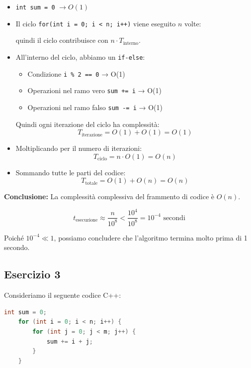 \begin{itemize}
	
	\item \texttt{int sum = 0} $\rightarrow O(1)$
	
	\item Il ciclo \texttt{for(int i = 0; i < n; i++)} viene eseguito $n$ volte:
	
	quindi il ciclo contribuisce con $n \cdot T_{\text{interno}}$.
	
	\item All'interno del ciclo, abbiamo un \texttt{if-else}:
	\begin{itemize}
		\item Condizione \texttt{i \% 2 == 0} → O(1)
		\item Operazioni nel ramo vero \texttt{sum += i} → O(1)
		\item Operazioni nel ramo falso \texttt{sum -= i} → O(1)
	\end{itemize}
	Quindi ogni iterazione del ciclo ha complessità:
	\[
	T_{\text{iterazione}} = O(1) + O(1) = O(1)
	\]
	
	\item Moltiplicando per il numero di iterazioni:
	\[
	T_{\text{ciclo}} = n \cdot O(1) = O(n)
	\]
	
	\item Sommando tutte le parti del codice:
	\[
	T_{\text{totale}} = O(1) + O(n) = O(n)
	\]
\end{itemize}

\textbf{Conclusione:}  
La complessità complessiva del frammento di codice è $O(n)$.


\[
t_{\text{esecuzione}} \approx \frac{n}{10^8} < \frac{10^4}{10^8} = 10^{-4} \text{ secondi}
\]

\noindent
Poiché $10^{-4} \ll 1$, possiamo concludere che l'algoritmo termina molto prima di 1 secondo.






\subsection{Esercizio 3}

Consideriamo il seguente codice C++:

\begin{lstlisting}[language=C++]
	int sum = 0;
	for (int i = 0; i < n; i++) {
		for (int j = 0; j < m; j++) {
			sum += i + j;
		}
	}
\end{lstlisting}

